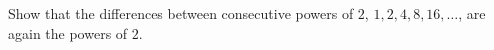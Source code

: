 Show that the differences between consecutive powers of $2$, $1,2,4,8,16,\dots$, are again the powers of $2$.
